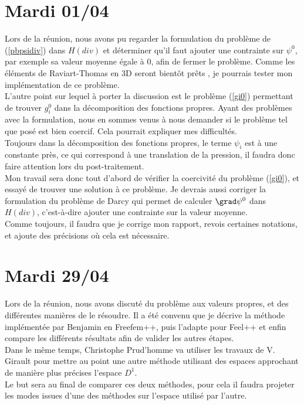 \section{Mardi 01/04}

Lors de la réunion, nous avons pu regarder la formulation du problème de (\ref{pbpsidiv}) dans $H(div)$ et déterminer qu’il faut ajouter une contrainte sur $\psi^0$, par exemple sa valeur moyenne égale à 0, afin de fermer le problème. Comme les éléments de Raviart-Thomas en 3D seront bientôt prêts , je pourrais tester mon implémentation de ce problème.\\
L’autre point sur lequel à porter la discussion est le problème (\ref{gi0}) permettant de trouver $g_i^0$ dans la décomposition des fonctions propres. Ayant des problèmes avec la formulation, nous en sommes venus à nous demander si le problème tel que posé est bien coercif. Cela pourrait expliquer mes difficultés.\\
Toujours dans la décomposition des fonctions propres, le terme $\psi_i$ est à une constante près, ce qui correspond à une translation de la pression, il faudra donc faire attention lors du post-traitement.\\

Mon travail sera donc tout d’abord de vérifier la coercivité du problème (\ref{gi0}), et essayé de trouver une solution à ce problème. Je devrais aussi corriger la formulation du problème de Darcy qui permet de calculer $\grad\psi^0$ dans $H(div)$, c’est-à-dire ajouter une contrainte sur la valeur moyenne.\\
Comme toujours, il faudra que je corrige mon rapport, revois certaines notations, et ajoute des précisions où cela est nécessaire.

\section{Mardi 29/04}

Lors de la réunion, nous avons discuté du problème aux valeurs propres, et des différentes manières de le résoudre. Il a été convenu que je décrive la méthode implémentée par Benjamin en Freefem++, puis l'adapte pour Feel++ et enfin compare les différents résultats afin de valider les autres étapes.\\
Dans le même temps, Christophe Prud'homme va utiliser les travaux de V. Girault \cite{girault90-1} pour mettre au point une autre méthode utilisant des espaces approchant de manière plus précises l'espace $D^1$.\\
Le but sera au final de comparer ces deux méthodes, pour cela il faudra projeter les modes issues d'une des méthodes sur l'espace utilisé par l'autre.\\

